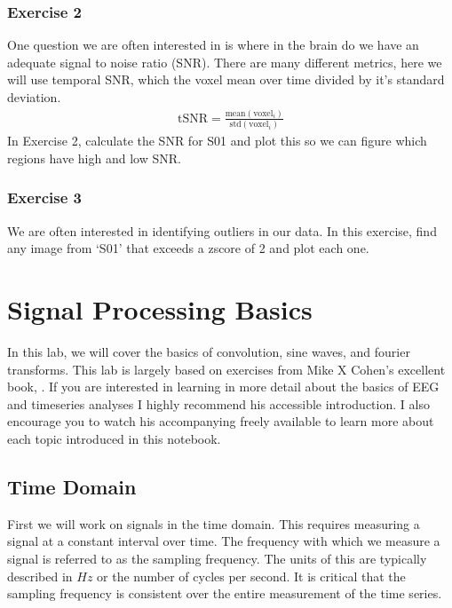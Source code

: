 \documentclass[letterpaper,10pt,english]{sphinxmanual}
\begin{document}
\subsubsection{Exercise 2}
\label{\detokenize{content/Introduction_to_Neuroimaging_Data:exercise-2}}
One question we are often interested in is where in the brain do we have an adequate signal to noise ratio (SNR). There are many different metrics, here we will use temporal SNR, which the voxel mean over time divided by it’s standard deviation.
\begin{equation*}
\begin{split}\text{tSNR} = \frac{\text{mean}(\text{voxel}_{i})}{\text{std}(\text{voxel}_i)}\end{split}
\end{equation*}
In Exercise 2, calculate the SNR for S01 and plot this so we can figure which regions have high and low SNR.


\subsubsection{Exercise 3}
\label{\detokenize{content/Introduction_to_Neuroimaging_Data:exercise-3}}
We are often interested in identifying outliers in our data. In this exercise, find any image from ‘S01’ that exceeds a zscore of 2 and plot each one.


\section{Signal Processing Basics}
\label{\detokenize{content/Signal_Processing:signal-processing-basics}}\label{\detokenize{content/Signal_Processing::doc}}

In this lab, we will cover the basics of convolution, sine waves, and fourier transforms. This lab is largely based on exercises from Mike X Cohen’s excellent book, . If you are interested in learning in more detail about the basics of EEG and time\sphinxhyphen{}series analyses I highly recommend his accessible introduction. I also encourage you to watch his accompanying freely available  to learn more about each topic introduced in this notebook.


\subsection{Time Domain}
\label{\detokenize{content/Signal_Processing:time-domain}}
First we will work on signals in the time domain.  This requires measuring a signal at a constant interval over time.  The frequency with which we measure a signal is referred to as the sampling frequency.  The units of this are typically described in \(Hz\) \sphinxhyphen{} or the number of cycles per second. It is critical that the sampling frequency is consistent over the entire measurement of the time series.
\end{document}
